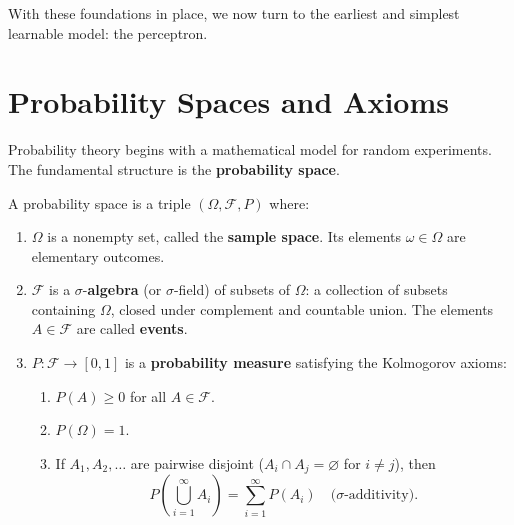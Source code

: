 \documentclass{tufte-handout}
\begin{document}
With these foundations in place, we now turn to the earliest and simplest learnable model: the perceptron.




\section{Probability Spaces and Axioms}

Probability theory begins with a mathematical model for random experiments. The fundamental structure is the \textbf{probability space}.

\begin{defn}
    A probability space is a triple $(\Omega, \mathcal{F}, P)$ where:
    \begin{enumerate}[label=(\roman*)]
        \item $\Omega$ is a nonempty set, called the \textbf{sample space}. Its elements $\omega \in \Omega$ are elementary outcomes.
        \item $\mathcal{F}$ is a $\sigma$-\textbf{algebra} (or $\sigma$-field) of subsets of $\Omega$: a collection of subsets containing $\Omega$, closed under complement and countable union. The elements $A \in \mathcal{F}$ are called \textbf{events}.
        \item $P: \mathcal{F} \to [0,1]$ is a \textbf{probability measure} satisfying the Kolmogorov axioms:
            \begin{enumerate}
                \item $P(A) \ge 0$ for all $A \in \mathcal{F}$.
                \item $P(\Omega) = 1$.
                \item If $A_1, A_2, \dots$ are pairwise disjoint ($A_i \cap A_j = \varnothing$ for $i \ne j$), then
                \[
                P\!\left(\bigcup_{i=1}^{\infty} A_i\right) = \sum_{i=1}^{\infty} P(A_i) \quad \text{($\sigma$-additivity)}.
                \]
                \end{enumerate}
            \end{enumerate}
\end{defn}

\begin{marginfigure}
\centering
{}
\caption{A sample space $\Omega$ with two events $A$ and $B$.}
\end{marginfigure}
\end{document}
